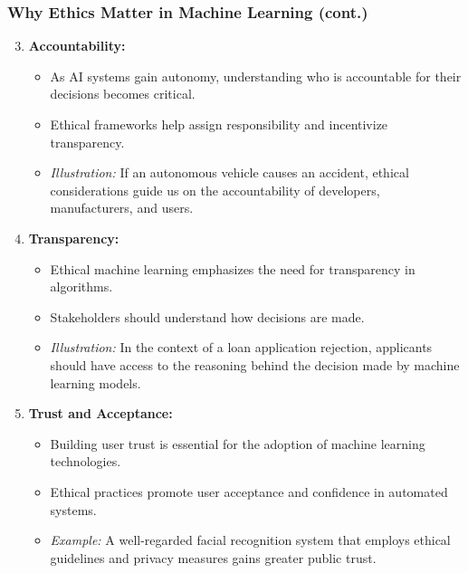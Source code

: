 \documentclass{beamer}
\begin{document}
\begin{frame}[fragile]
    \frametitle{Why Ethics Matter in Machine Learning (cont.)}
    \begin{enumerate}
        \setcounter{enumi}{2} %
        \item \textbf{Accountability:}
            \begin{itemize}
                \item As AI systems gain autonomy, understanding who is accountable for their decisions becomes critical.
                \item Ethical frameworks help assign responsibility and incentivize transparency.
                \item \textit{Illustration:} If an autonomous vehicle causes an accident, ethical considerations guide us on the accountability of developers, manufacturers, and users.
            \end{itemize}

        \item \textbf{Transparency:}
            \begin{itemize}
                \item Ethical machine learning emphasizes the need for transparency in algorithms.
                \item Stakeholders should understand how decisions are made.
                \item \textit{Illustration:} In the context of a loan application rejection, applicants should have access to the reasoning behind the decision made by machine learning models.
            \end{itemize}

        \item \textbf{Trust and Acceptance:}
            \begin{itemize}
                \item Building user trust is essential for the adoption of machine learning technologies.
                \item Ethical practices promote user acceptance and confidence in automated systems.
                \item \textit{Example:} A well-regarded facial recognition system that employs ethical guidelines and privacy measures gains greater public trust.
            \end{itemize}
    \end{enumerate}
\end{frame}
\end{document}
